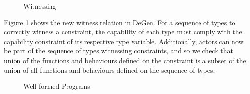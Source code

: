 \begin{figure}[H]
    \centering
    \begin{mathpar}
    \end{mathpar}
    \caption{Witnessing}
    \label{fig:degen-wit}
\end{figure}

Figure \ref{fig:degen-wit} shows the new witness relation in DeGen. For a sequence of types to correctly witness a constraint, the capability of each type must comply with the capability constraint of its respective type variable. Additionally, actors can now be part of the sequence of types witnessing constraints, and so we check that union of the functions and behaviours defined on the constraint is a subset of the union of all functions and behaviours defined on the sequence of types.

\begin{figure}[H]
    \centering
    \begin{mathpar}
    \end{mathpar}
    \caption{Well-formed Programs}
    \label{fig:degen-wfp}
\end{figure}

